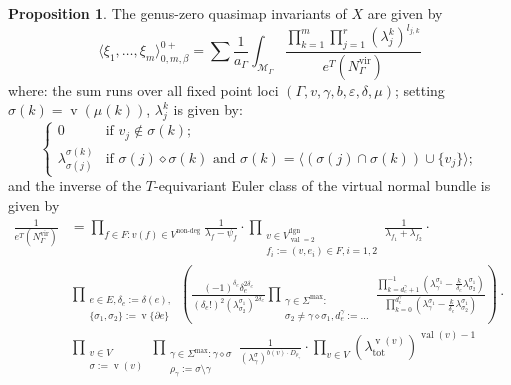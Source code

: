 \documentclass[11pt]{amsart}
\newcommand{\val}{\operatorname{val}}
\newcommand{\vv}{\operatorname{v}}
\theoremstyle{definition}
\newtheorem{prop}[thm]{Proposition}
\theoremstyle{definition}
\begin{document}
\begin{prop}

The genus-zero quasimap invariants of $X$ are given by
\begin{equation}
 \langle \xi_1,\ldots,\xi_m\rangle^{0+}_{0,m,\beta}=\sum \frac{1}{a_\Gamma}\int_{\mathcal M_\Gamma}\frac{\prod_{k=1}^m\prod_{j=1}^r(\lambda^k_j)^{l_{j,k}}}{e^T(N_\Gamma^\text{vir})}
\end{equation}
where: the sum runs over all fixed point loci $\left(\Gamma, v, \gamma, b,\varepsilon,\delta,\mu\right)$; setting $\sigma(k)=\vv(\mu(k))$, $\lambda^k_j$ is given by: 
\begin{equation*}
 \begin{cases}
  0 & \text{if } v_j\notin \sigma(k); \\
  \lambda^{\sigma(k)}_{\sigma(j)} & \text{if } \sigma(j)\diamond\sigma(k) \text{ and } \sigma(k)=\langle(\sigma(j)\cap\sigma(k))\cup\{v_j\}\rangle;
 \end{cases}
\end{equation*}
and the inverse of the $T$-equivariant Euler class of the virtual normal bundle is given by
\begin{equation}
 \begin{aligned}
  \frac{1}{e^T(N_\Gamma^{\text{vir}})}&=\prod_{f\in F\colon v(f)\in V^{\text{non-deg}}} \frac{1}{\lambda_f-\psi_f} \cdot \prod_{\substack{v\in V^\text{dgn}_{\val=2}\\ f_i:=(v,e_i)\in F, i=1,2}} \frac{1}{\lambda_{f_1}+\lambda_{f_2}} \cdot \\
  &\prod_{\substack{e\in E, \delta_e:=\delta(e), \\ \{\sigma_1,\sigma_2\}:=\vv\{\partial e\}}}\left( \frac{(-1)^{\delta_e}\delta_e^{2\delta_e}}{(\delta_e!)^2(\lambda^{\sigma_1}_{\sigma_2})^{2\delta_e}}\prod_{\substack{\gamma\in\Sigma^{\text{max}}\colon \\ \sigma_2\neq\gamma\diamond\sigma_1,d^\gamma_e:=\ldots}}\frac{\prod_{k=d^\gamma_e+1}^{-1}(\lambda^{\sigma_1}_{\gamma}-\frac{k}{\delta_e}\lambda^{\sigma_1}_{\sigma_2})}{\prod_{k=0}^{d^\gamma_e}(\lambda^{\sigma_1}_{\gamma}-\frac{k}{\delta_e}\lambda^{\sigma_1}_{\sigma_2})} \right) \cdot \\
  & \prod_{\substack{v\in V \\ \sigma:=\vv(v)}} \prod_{\substack{\gamma\in\Sigma^{\text{max}}\colon\gamma\diamond\sigma \\ \rho_\gamma:=\sigma\setminus\gamma}}\frac{1}{(\lambda^{\sigma}_{\gamma})^{b(v)\cdot D_{\rho_\gamma}}}\cdot \prod_{v\in V}(\lambda^{\vv(v)}_{\text{tot}})^{\val(v)-1}
 \end{aligned}
\end{equation}
\end{prop}
\end{document}
